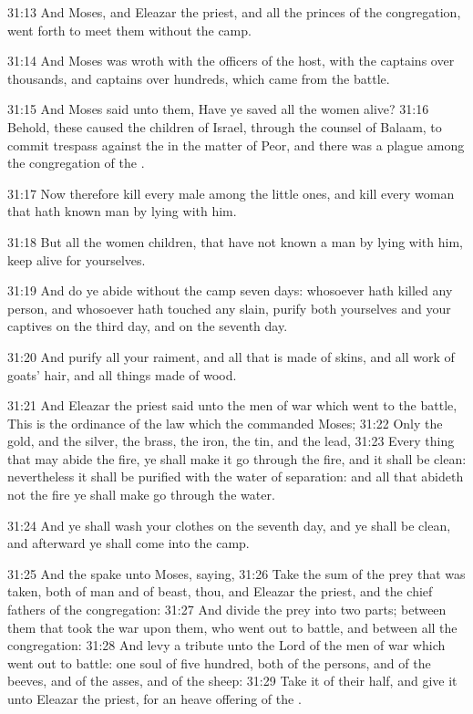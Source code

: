 31:13 And Moses, and Eleazar the priest, and all the princes of the congregation, went forth to meet them without the camp.

31:14 And Moses was wroth with the officers of the host, with the captains over thousands, and captains over hundreds, which came from the battle.

31:15 And Moses said unto them, Have ye saved all the women alive?  31:16 Behold, these caused the children of Israel, through the counsel of Balaam, to commit trespass against the \LORD in the matter of Peor, and there was a plague among the congregation of the \LORD.

31:17 Now therefore kill every male among the little ones, and kill every woman that hath known man by lying with him.

31:18 But all the women children, that have not known a man by lying with him, keep alive for yourselves.

31:19 And do ye abide without the camp seven days: whosoever hath killed any person, and whosoever hath touched any slain, purify both yourselves and your captives on the third day, and on the seventh day.

31:20 And purify all your raiment, and all that is made of skins, and all work of goats' hair, and all things made of wood.

31:21 And Eleazar the priest said unto the men of war which went to the battle, This is the ordinance of the law which the \LORD commanded Moses; 31:22 Only the gold, and the silver, the brass, the iron, the tin, and the lead, 31:23 Every thing that may abide the fire, ye shall make it go through the fire, and it shall be clean: nevertheless it shall be purified with the water of separation: and all that abideth not the fire ye shall make go through the water.

31:24 And ye shall wash your clothes on the seventh day, and ye shall be clean, and afterward ye shall come into the camp.

31:25 And the \LORD spake unto Moses, saying, 31:26 Take the sum of the prey that was taken, both of man and of beast, thou, and Eleazar the priest, and the chief fathers of the congregation: 31:27 And divide the prey into two parts; between them that took the war upon them, who went out to battle, and between all the congregation: 31:28 And levy a tribute unto the Lord of the men of war which went out to battle: one soul of five hundred, both of the persons, and of the beeves, and of the asses, and of the sheep: 31:29 Take it of their half, and give it unto Eleazar the priest, for an heave offering of the \LORD.

